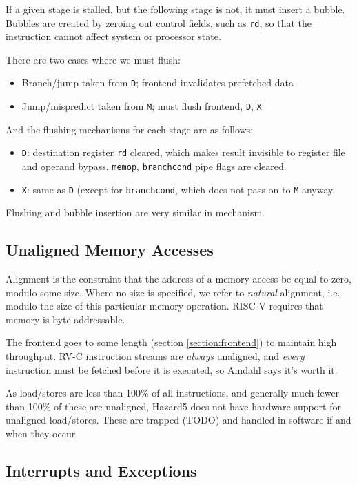 \documentclass[notitlepage]{article}
\begin{document}
If a given stage is stalled, but the following stage is not, it must insert a bubble. Bubbles are created by zeroing out control fields, such as {\tt rd}, so that the instruction cannot affect system or processor state.

There are two cases where we must flush:

\begin{itemize}
	\item Branch/jump taken from {\tt D}; frontend invalidates prefetched data
	\item Jump/mispredict taken from {\tt M}; must flush frontend, {\tt D}, {\tt X}
\end{itemize}

And the flushing mechanisms for each stage are as follows:
\begin{itemize}
	\item {\tt D}: destination register {\tt rd} cleared, which makes result invisible to register file and operand bypass. {\tt memop}, {\tt branchcond} pipe flags are cleared.
	\item {\tt X}: same as {\tt D} (except for {\tt branchcond}, which does not pass on to {\tt M} anyway.
\end{itemize}

Flushing and bubble insertion are very similar in mechanism.

\subsection{Unaligned Memory Accesses}

Alignment is the constraint that the address of a memory access be equal to zero, modulo some size. Where no size is specified, we refer to {\it natural} alignment, i.e. modulo the size of this particular memory operation. RISC-V requires that memory is byte-addressable.

The frontend goes to some length (section \ref{section:frontend}) to maintain high throughput. RV-C instruction streams are {\it always} unaligned, and {\it every} instruction must be fetched before it is executed, so Amdahl says it's worth it.

As load/stores are less than 100\% of all instructions, and generally much fewer than 100\% of these are unaligned, Hazard5 does not have hardware support for unaligned load/stores. These are trapped (TODO) and handled in software if and when they occur.

\subsection{Interrupts and Exceptions}
\end{document}
